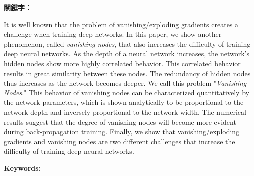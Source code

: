 \begin{abstractzh}

\bigbreak
\noindent \textbf{關鍵字：}{\, \makeatletter \@keywordszh \makeatother}
\end{abstractzh}

\begin{abstracten}
    It is well known that the problem of vanishing/exploding gradients creates a challenge when 
    training deep networks. In this paper, we show another phenomenon, called \textit{vanishing nodes},
    that also increases the difficulty of training deep neural networks.
    As the depth of a neural network increases, the network's hidden nodes show more highly
    correlated behavior. This correlated behavior results in great similarity between these nodes.
    The redundancy of hidden nodes thus increases as the network becomes deeper.
    We call this problem "\textit{Vanishing Nodes}."
    This behavior of vanishing nodes can be characterized quantitatively by the network parameters,
    which is shown analytically to be proportional to the network depth and inversely proportional
    to the network width. The numerical results suggest that the degree of vanishing nodes will become
    more evident during back-propagation training. Finally, we show that vanishing/exploding gradients
    and vanishing nodes are two different challenges that increase the difficulty of training deep
    neural networks.

\bigbreak
\noindent \textbf{Keywords:}{\, \makeatletter \@keywordsen \makeatother}
\end{abstracten}

\begin{comment}
\category{I2.10}{Computing Methodologies}{Artificial Intelligence --
Vision and Scene Understanding} \category{H5.3}{Information
Systems}{Information Interfaces and Presentation (HCI) -- Web-based
Interaction.}

\terms{Design, Human factors, Performance.}

\keywords{Deep learning}
\end{comment}
